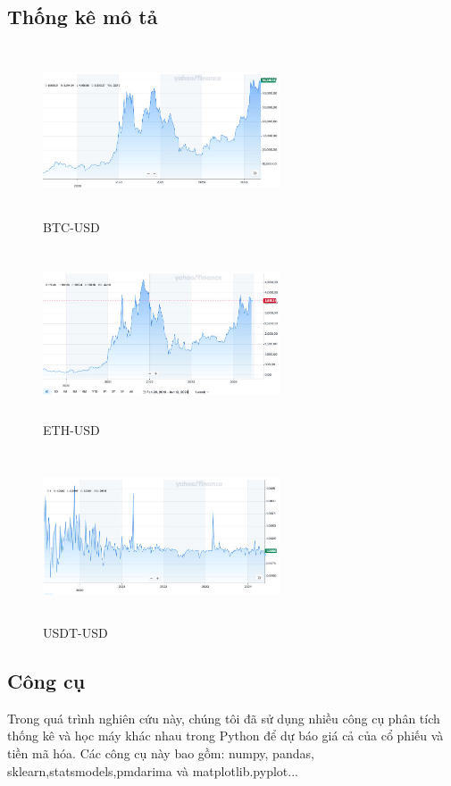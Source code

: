 \documentclass[conference]{IEEEtran}
\begin{document}
\subsection{Thống kê mô tả}
 \begin{figure}[H]
        \centering
        \includegraphics[width= 7cm, height= 5cm]{Images/BTC.png}
        \caption{BTC-USD}
    \end{figure}
   \begin{figure}[H]
        \centering
        \includegraphics[width= 7cm, height= 5cm]{Images/ETH.png}
        \caption{ETH-USD}
    \end{figure} 
     \begin{figure}[H]
        \centering
        \includegraphics[width= 7cm, height= 5cm]{Images/USDT.png}
        \caption{USDT-USD}
    \end{figure}
\subsection{Công cụ}
Trong quá trình nghiên cứu này, chúng tôi đã sử dụng nhiều công cụ phân tích thống kê và học máy khác nhau trong Python để dự báo giá cả của cổ phiếu và tiền mã hóa. Các công cụ này bao gồm: numpy, pandas,
sklearn,statsmodels,pmdarima và matplotlib.pyplot...
\end{document}

